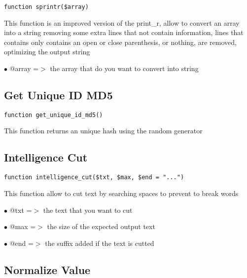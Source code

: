 \documentclass[a4paper]{book}
\begin{document}
\begin{lstlisting}
function sprintr($array)
\end{lstlisting}

This function is an improved version of the print\_r, allow to convert an
array into a string removing some extra lines that not contain information,
lines that contains only contains an open or close parenthesis, or nothing,
are removed, optimizing the output string

\begin{compactitem}
\item[\color{myblue}$\bullet$] @array =$>$ the array that do you want to convert into string
\end{compactitem}

\hypertarget{toc255}{}
\subsection{Get Unique ID MD5}

\begin{lstlisting}
function get_unique_id_md5()
\end{lstlisting}

This function returns an unique hash using the random generator

\hypertarget{toc256}{}
\subsection{Intelligence Cut}

\begin{lstlisting}
function intelligence_cut($txt, $max, $end = "...")
\end{lstlisting}

This function allow to cut text by searching spaces to prevent to break words

\begin{compactitem}
\item[\color{myblue}$\bullet$] @txt =$>$ the text that you want to cut
\item[\color{myblue}$\bullet$] @max =$>$ the size of the expected output text
\item[\color{myblue}$\bullet$] @end =$>$ the suffix added if the text is cutted
\end{compactitem}

\hypertarget{toc257}{}
\subsection{Normalize Value}
\end{document}
